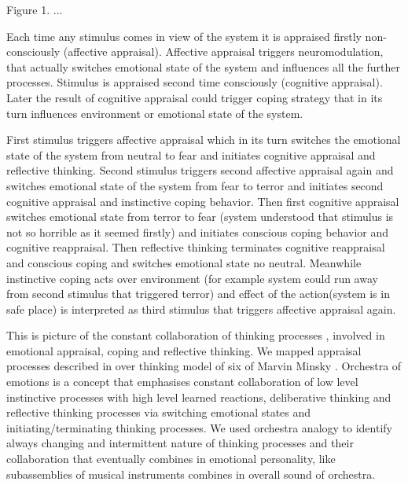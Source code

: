 \begin{center}
Figure 1. ...
\end{center}

Each time any stimulus comes in view of the system it is appraised firstly non-consciously (affective appraisal). Affective appraisal triggers neuromodulation, that actually switches emotional state of the system and influences all the further processes. Stimulus is appraised second time consciously (cognitive appraisal). Later the result of cognitive appraisal could trigger coping strategy that in its turn influences environment or emotional state of the system.

First stimulus triggers affective appraisal which in its turn switches the emotional state of the system from neutral to fear and initiates cognitive appraisal and reflective thinking. Second stimulus triggers second affective appraisal again and switches emotional state of the system from fear to terror and initiates second cognitive appraisal and instinctive coping behavior. Then first cognitive appraisal switches emotional state from terror to fear (system understood that stimulus is not so horrible as it seemed firstly) and initiates conscious coping behavior and cognitive reappraisal. Then reflective thinking terminates cognitive reappraisal and conscious coping and switches emotional state no neutral. Meanwhile instinctive coping acts over environment (for example system could run away from second stimulus that triggered terror) and effect of the action(system is in safe place) is interpreted as third stimulus that triggers affective appraisal again.

This is picture of the constant collaboration of thinking processes \cite{emotionmachine}, involved in emotional appraisal, coping and reflective thinking. We mapped appraisal processes described in \cite{putting_appraisal_in_context, appraisal_determinants_of_emotions, appraisal_considered_as_a_process} over thinking model of six of Marvin Minsky \cite{emotionmachine}. Orchestra of emotions is a concept that emphasises constant collaboration of low level instinctive processes with high level learned reactions, deliberative thinking and reflective thinking processes via switching emotional states and initiating/terminating thinking processes. We used orchestra analogy to identify always changing and intermittent nature of thinking processes and their  collaboration that eventually combines in emotional personality, like subassemblies of musical instruments combines in overall sound of orchestra.

